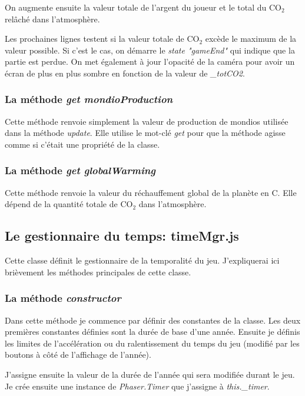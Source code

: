 \documentclass{article}
\begin{document}
		
		On augmente ensuite la valeur totale de l'argent du joueur et le total du CO$_{2}$ relâché dans l'atmosphère.
		
		
		Les prochaines lignes testent si la valeur totale de CO$_{2}$ excède le maximum de la valeur possible. Si c'est le cas, on démarre le \textit{state "gameEnd"} qui indique que la partie est perdue. On met également à jour l'opacité de la caméra pour avoir un écran de plus en plus sombre en fonction de la valeur de \textit{\_totCO2}.
		
		\subsubsection{La méthode \textit{get mondioProduction}} \label{mondioProduction}
		Cette méthode renvoie simplement la valeur de production de mondios utilisée dans la méthode \textit{update}. Elle utilise le mot-clé \textit{get} pour que la méthode agisse comme si c'était une propriété de la classe.
		
		\subsubsection{La méthode \textit{get globalWarming}} \label{globalWarming}
		Cette méthode renvoie la valeur du réchauffement global de la planète en \degree C. Elle dépend de la quantité totale de CO$_{2}$ dans l'atmosphère.
		
		\subsection{Le gestionnaire du temps: timeMgr.js} \label{timeMgr}
		
		
		Cette classe définit le gestionnaire de la temporalité du jeu. J'expliquerai ici brièvement les méthodes principales de cette classe.
		
		\subsubsection{La méthode \textit{constructor}}
		Dans cette méthode je commence par définir des constantes de la classe. Les deux premières constantes définies sont la durée de base d'une année. Ensuite je définis les limites de l'accélération ou du ralentissement du temps du jeu (modifié par les boutons à côté de l'affichage de l'année).
		
		
		J'assigne ensuite la valeur de la durée de l'année qui sera modifiée durant le jeu. Je crée ensuite une instance de \textit{Phaser.Timer} que j'assigne à \textit{this.\_timer}.
		
\end{document}
